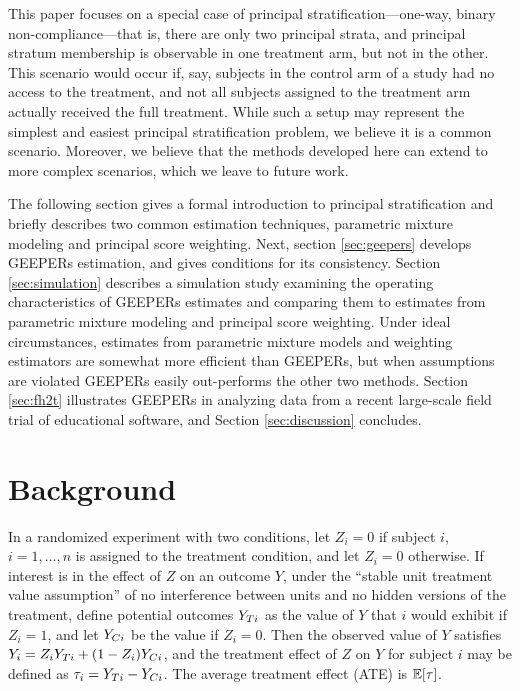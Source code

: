 \documentclass[11pt]{article} %
\begin{document}
This paper focuses on a special case of principal stratification---one-way, binary non-compliance---that is, there are only two principal strata, and principal stratum membership is observable in one treatment arm, but not in the other.
This scenario would occur if, say, subjects in the control arm of a study had no access to the treatment, and not all subjects assigned to the treatment arm actually received the full treatment.
While such a setup may represent the simplest and easiest principal stratification problem, we believe it is a common scenario.
Moreover, we believe that the methods developed here can extend to more complex scenarios, which we leave to future work.

The following section gives a formal introduction to principal stratification and briefly describes two common estimation techniques, parametric mixture modeling and principal score weighting.
Next, section \ref{sec:geepers} develops GEEPERs estimation, and gives conditions for its consistency.
Section \ref{sec:simulation} describes a simulation study examining the operating characteristics of GEEPERs estimates and comparing them to estimates from parametric mixture modeling and principal score weighting.
Under ideal circumstances, estimates from parametric mixture models and weighting estimators are somewhat more efficient than GEEPERs, but when assumptions are violated GEEPERs easily out-performs the other two methods.
Section \ref{sec:fh2t} illustrates GEEPERs in analyzing data from a recent large-scale field trial of educational software, and Section \ref{sec:discussion} concludes.



\section{Background}
In a randomized experiment with two conditions, let $Z_i=0$ if subject $i$, $i=1,\dots,n$ is assigned to the treatment condition, and let $Z_i=0$ otherwise.
If interest is in the effect of $Z$ on an outcome $Y$, under the ``stable unit treatment value assumption'' \citep{air} of no interference between units and no hidden versions of the treatment, define potential outcomes \citep{splawa1990application,air} $Y_{Ti}$ as the value of $Y$ that $i$ would exhibit if $Z_i=1$, and let $Y_{Ci}$ be the value if $Z_i=0$. Then the observed value of $Y$ satisfies $Y_i=Z_iY_{Ti}+(1-Z_i)Y_{Ci}$, and the treatment effect of $Z$ on $Y$ for subject $i$ may be defined as $\tau_i=Y_{Ti}-Y_{Ci}$. The average treatment effect (ATE) is $\mathbb{E}[\tau]$. %
\end{document}
